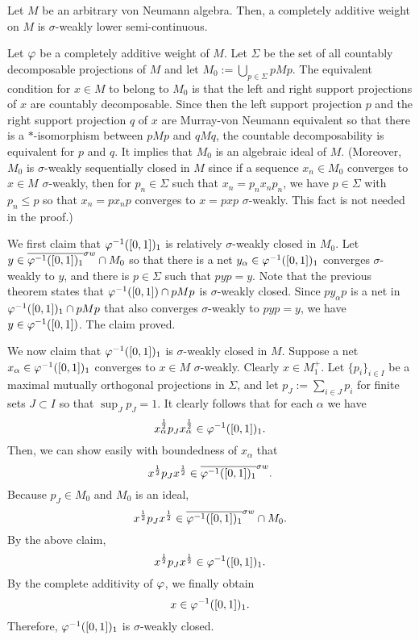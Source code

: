 \documentclass{../../small}
\begin{document}
\begin{thm}
Let $M$ be an arbitrary von Neumann algebra.
Then, a completely additive weight on $M$ is $\sigma$-weakly lower semi-continuous.
\end{thm}
\begin{pf}
Let $\varphi$ be a completely additive weight of $M$.
Let $\Sigma$ be the set of all countably decomposable projections of $M$ and let $M_0:=\bigcup_{p\in\Sigma}pMp$.
The equivalent condition for $x\in M$ to belong to $M_0$ is that the left and right support projections of $x$ are countably decomposable.
Since then the left support projection $p$ and the right support projection $q$ of $x$ are Murray-von Neumann equivalent so that there is a $*$-isomorphism between $pMp$ and $qMq$, the countable decomposability is equivalent for $p$ and $q$.
It implies that $M_0$ is an algebraic ideal of $M$.
(Moreover, $M_0$ is $\sigma$-weakly sequentially closed in $M$ since if a sequence $x_n\in M_0$ converges to $x\in M$ $\sigma$-weakly, then for $p_n\in\Sigma$ such that $x_n=p_nx_np_n$, we have $p\in\Sigma$ with $p_n\le p$ so that $x_n=px_np$ converges to $x=pxp$ $\sigma$-weakly.
This fact is not needed in the proof.)

We first claim that $\varphi^{-1}([0,1])_1$ is relatively $\sigma$-weakly closed in $M_0$.
Let $y\in\overline{\varphi^{-1}([0,1])_1}^{\sigma w}\cap M_0$ so that there is a net $y_\alpha\in\varphi^{-1}([0,1])_1$ converges $\sigma$-weakly to $y$, and there is $p\in\Sigma$ such that $pyp=y$.
Note that the previous theorem states that $\varphi^{-1}([0,1])\cap pMp$ is $\sigma$-weakly closed.
Since $py_\alpha p$ is a net in $\varphi^{-1}([0,1])_1\cap pMp$ that also converges $\sigma$-weakly to $pyp=y$, we have $y\in\varphi^{-1}([0,1])$.
The claim proved.

We now claim that $\varphi^{-1}([0,1])_1$ is $\sigma$-weakly closed in $M$.
Suppose a net $x_\alpha\in\varphi^{-1}([0,1])_1$ converges to $x\in M$ $\sigma$-weakly.
Clearly $x\in M_1^+$.
Let $\{p_i\}_{i\in I}$ be a maximal mutually orthogonal projections in $\Sigma$, and let $p_J:=\sum_{i\in J}p_i$ for finite sets $J\subset I$ so that $\sup_Jp_J=1$.
It clearly follows that for each $\alpha$ we have
\[x_\alpha^{\frac12}p_Jx_\alpha^{\frac12}\in\varphi^{-1}([0,1])_1.\]
Then, we can show easily with boundedness of $x_\alpha$ that
\[x^{\frac12}p_Jx^{\frac12}\in\overline{\varphi^{-1}([0,1])_1}^{\sigma w}.\]
Because $p_J\in M_0$ and $M_0$ is an ideal, 
\[x^{\frac12}p_Jx^{\frac12}\in\overline{\varphi^{-1}([0,1])_1}^{\sigma w}\cap M_0.\]
By the above claim,
\[x^{\frac12}p_Jx^{\frac12}\in\varphi^{-1}([0,1])_1.\]
By the complete additivity of $\varphi$, we finally obtain
\[x\in\varphi^{-1}([0,1])_1.\]
Therefore, $\varphi^{-1}([0,1])_1$ is $\sigma$-weakly closed.
\end{pf}
\end{document}
